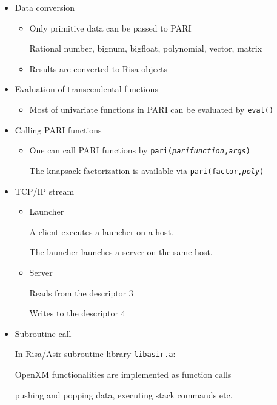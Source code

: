 \begin{slide}{}

\begin{itemize}
\item Data conversion

\begin{itemize}

\item Only primitive data can be passed to PARI

Rational number, bignum, bigfloat, polynomial,
vector, matrix

\item Results are converted to Risa objects

\end{itemize}

\item Evaluation of transcendental functions

\begin{itemize}
\item Most of univariate functions in PARI can be 
evaluated by {\tt eval()}
\end{itemize}

\item Calling PARI functions

\begin{itemize}
\item One can call PARI functions by {\tt pari({\it parifunction},{\it args})}

The knapsack factorization is available via {\tt pari(factor,{\it poly})}
\end{itemize}
\end{itemize}
\end{slide}

\begin{slide}{}

\begin{itemize}
\item TCP/IP stream

\begin{itemize}
\item Launcher

A client executes a launcher on a host.

The launcher launches a server on the same host.

\item Server

Reads from the descriptor 3

Writes to the descriptor 4

\end{itemize}

\item Subroutine call

In Risa/Asir subroutine library {\tt libasir.a}:

OpenXM functionalities are implemented as function calls

pushing and popping data, executing stack commands etc.
\end{itemize}
\end{slide}

